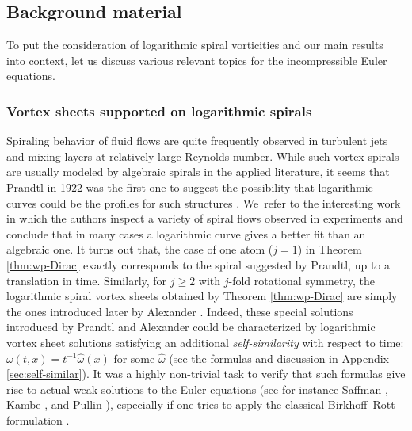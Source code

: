 \documentclass[JEP,XML,SOM,Unicode,NoFloatCountersInSection,published]{cedram}
\theoremstyle{plain}
\theoremstyle{definition}
\let\omg\omega
\begin{document}
\subsection{Background material}

To put the consideration of logarithmic spiral vorticities and our main results into context, let us discuss various relevant topics for the incompressible Euler equations.

\subsubsection*{Vortex sheets supported on logarithmic spirals}
Spiraling behavior of fluid flows are quite frequently observed in turbulent jets and mixing layers at relatively large Reynolds number. While such vortex spirals are usually modeled by algebraic spirals in the applied literature, it seems that Prandtl in 1922 was the first one to suggest the possibility that logarithmic curves could be the profiles for such structures \cite{Prandtl61}. We~refer to the interesting work \cite{Spiral} in which the authors inspect a variety of spiral flows observed in experiments and conclude that in many cases a logarithmic curve gives a better fit than an algebraic one. It turns out that, the case of one atom ($j=1$) in Theorem \ref{thm:wp-Dirac} exactly corresponds to the spiral suggested by Prandtl, up to a translation in time. Similarly, for $j\ge2$ with $j$-fold rotational symmetry, the logarithmic spiral vortex sheets obtained by Theorem \ref{thm:wp-Dirac} are simply the ones introduced later by Alexander \cite{Alexander71}. Indeed, these special solutions introduced by Prandtl and Alexander could be characterized by logarithmic vortex sheet solutions satisfying an additional \textit{self-similarity} with respect to time: $\omg(t,x)=t^{-1}\hat{\omg}(x)$ for some $\hat{\omg}$ (see the formulas and discussion in Appendix \ref{sec:self-similar}). It was a highly non-trivial task to verify that such formulas give rise to actual weak solutions to the Euler equations (see for instance Saffman \cite[\S 8.3]{Saff}, Kambe \cite{Kam}, and Pullin \cite{Pull}), especially if one tries to apply the classical Birkhoff--Rott formulation \cite{Birkhoff,Rott}.
\end{document}
